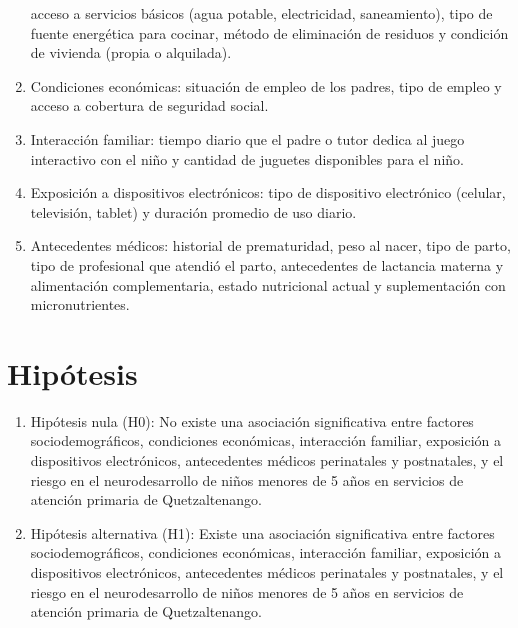 \documentclass[11pt,letterpaper]{report}
\begin{document}
\begin{enumerate}
acceso a servicios básicos (agua potable, electricidad, saneamiento), tipo de
fuente energética para cocinar, método de eliminación de residuos y condición
de vivienda (propia o alquilada).
	\item Condiciones económicas: situación de empleo de los padres, tipo de
empleo y acceso a cobertura de seguridad social.
	\item Interacción familiar: tiempo diario que el padre o tutor dedica al
juego interactivo con el niño y cantidad de juguetes disponibles para el niño.
	\item Exposición a dispositivos electrónicos: tipo de dispositivo
electrónico (celular, televisión, tablet) y duración promedio de uso diario.
	\item Antecedentes médicos: historial de prematuridad, peso al nacer, tipo
de parto, tipo de profesional que atendió el parto, antecedentes de lactancia
materna y alimentación complementaria, estado nutricional actual y
suplementación con micronutrientes.
\end{enumerate}

\section{Hipótesis}
\begin{enumerate}
	\item Hipótesis nula (H0): No existe una asociación significativa entre
	factores sociodemográficos, condiciones económicas, interacción familiar,
	exposición a dispositivos electrónicos, antecedentes médicos perinatales y
	postnatales, y el riesgo en el neurodesarrollo de niños menores de 5 años
	en servicios de atención primaria de Quetzaltenango.
\item Hipótesis alternativa (H1): Existe una asociación significativa entre
	factores sociodemográficos, condiciones económicas, interacción familiar,
	exposición a dispositivos electrónicos, antecedentes médicos perinatales y
	postnatales, y el riesgo en el neurodesarrollo de niños menores de 5 años
	en servicios de atención primaria de Quetzaltenango.
\end{enumerate}
\end{document}
